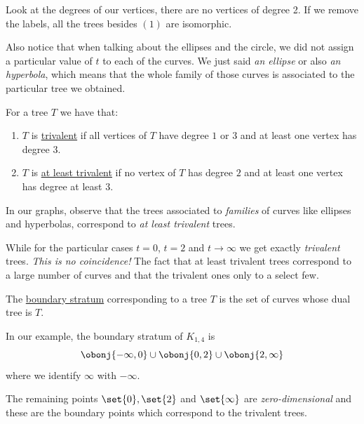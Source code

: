 \documentclass[12pt]{memoir}
\begin{document}
    \begin{Rmk}
    Look at the degrees of our vertices, there are no vertices of degree 2. If we remove the labels, all the trees besides $(1)$ are isomorphic.\par
    Also notice that when talking about the ellipses and the circle, we did not assign a particular value of $t$ to each of the curves. We just said \emph{an ellipse} or also \emph{an hyperbola}, which means that the whole family of those curves is associated to the particular tree we obtained.
    \end{Rmk}
    
    \begin{Def}
    For a tree $T$ we have that:
    \begin{enumerate}
        \itemsep=-0.4em
        \item $T$ is \underline{trivalent} if all vertices of $T$ have degree $1$ or $3$ and at least one vertex has degree $3$.
        \item $T$ is \underline{at least trivalent} if no vertex of $T$ has degree $2$ and at least one vertex has degree at least $3$.
    \end{enumerate}
    \end{Def}
    
    \begin{Rmk}
    In our graphs, observe that the trees associated to \emph{families} of curves like ellipses and hyperbolas, correspond to \emph{at least trivalent} trees.\par 
    While for the particular cases $t=0$, $t=2$ and $t\to\infty$ we get exactly \emph{trivalent} trees. \emph{This is no coincidence!} The fact that at least trivalent trees correspond to a large number of curves and that the trivalent ones only to a select few.
    \end{Rmk}
    
    \begin{Def}
        The \underline{boundary stratum} corresponding to a tree $T$ is the set of curves whose dual tree is $T$. 
    \end{Def}
    
    \begin{Ex}
    In our example, the boundary stratum of $K_{1,4}$ is $$\obonj{-\infty,0}\cup\obonj{0,2}\cup\obonj{2,\infty}$$
    where we identify $\infty$ with $-\infty$.\par 
    The remaining points $\set{0},\set{2}$ and $\set{\infty}$ are \emph{zero-dimensional} and these are the boundary points which correspond to the trivalent trees.
    \end{Ex} 
    
\end{document}

